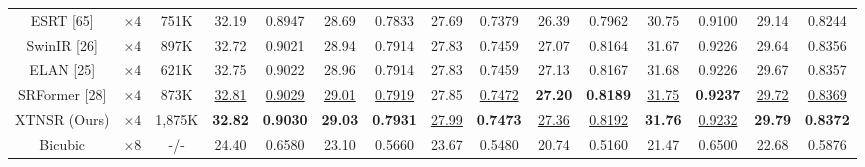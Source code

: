 \documentclass[twocolumn]{svjour3}          %
\begin{document}
\begin{table}
\begin{tabular}{|c|c|c|cc|cc|cc|cc|cc|cc|}
ESRT [65] & $\times 4$ &751K& \multicolumn{1}{c|}{32.19} & 0.8947 & \multicolumn{1}{c|}{28.69} & 0.7833 & \multicolumn{1}{c|}{27.69} & 0.7379 & \multicolumn{1}{c|}{26.39} &0.7962 & \multicolumn{1}{c|}{30.75} & 0.9100 &\multicolumn{1}{c|}{29.14} & 0.8244\\

SwinIR [26] & $\times4$  &897K& \multicolumn{1}{c|}{32.72} &{0.9021} & \multicolumn{1}{c|}{28.94} &{0.7914}& \multicolumn{1}{c|}{27.83} &{0.7459} & \multicolumn{1}{c|}{27.07} &{0.8164}& \multicolumn{1}{c|}{31.67} &{0.9226} &\multicolumn{1}{c|}{29.64} &{0.8356}  \\


ELAN [25] & $\times 4$ &621K& \multicolumn{1}{c|}{32.75} & 0.9022 & \multicolumn{1}{c|}{28.96} & 0.7914 & \multicolumn{1}{c|}{27.83} & 0.7459 & \multicolumn{1}{c|}{27.13} &0.8167 & \multicolumn{1}{c|}{31.68} & 0.9226 &\multicolumn{1}{c|}{29.67} & 0.8357\\

SRFormer [28] & $\times 4$ &873K& \multicolumn{1}{c|}{\color{blue}\underline{32.81}} & {\color{blue}\underline{0.9029}} & \multicolumn{1}{c|}{\color{blue}\underline{29.01}} &{\color{blue}\underline{ 0.7919}} & \multicolumn{1}{c|}{27.85} & {\color{blue}\underline{0.7472}} & \multicolumn{1}{c|}{\color{red}\textbf{27.20}} & {\color{red}\textbf{0.8189}} & \multicolumn{1}{c|}{\color{blue}\underline{31.75}} &{\color{red}\textbf{0.9237}} &\multicolumn{1}{c|}{\color{blue}\underline{29.72}} & {\color{blue}\underline{ 0.8369}}\\

XTNSR (Ours) & $\times 4$ &1,875K& \multicolumn{1}{c|}{\color{red}\textbf{32.82}} &{\color{red}\textbf{0.9030}} & \multicolumn{1}{c|}{\color{red}\textbf{29.03} } &{\color{red}\textbf{ 0.7931}} & \multicolumn{1}{c|}{\color{blue}\underline{27.99}} &{\color{red}\textbf{0.7473}}& \multicolumn{1}{c|}{\color{blue}\underline{27.36}} &{\color{blue}\underline{0.8192}}& \multicolumn{1}{c|}{\color{red}\textbf{31.76}} &{\color{blue}\underline{0.9232}} &\multicolumn{1}{c|}{\color{red}\textbf{29.79}} & {\color{red}\textbf{0.8372}}\\

\hline

Bicubic&$\times8$ &-/-& \multicolumn{1}{c|}{24.40} &0.6580& \multicolumn{1}{c|}{23.10} &0.5660 & \multicolumn{1}{c|}{23.67} &0.5480& \multicolumn{1}{c|}{20.74} &0.5160 & \multicolumn{1}{c|}{21.47} & 0.6500
&\multicolumn{1}{c|}{22.68} & 0.5876     \\


\end{tabular}
\end{table}
\end{document}
